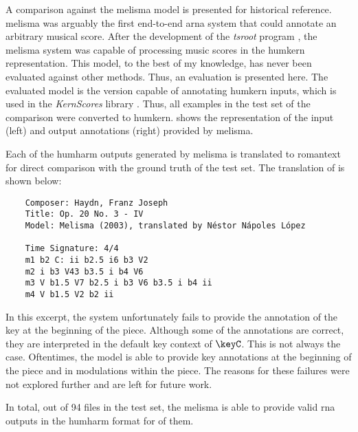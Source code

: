 
A comparison against the \gls{melisma} model is presented
for historical reference. \gls{melisma} was arguably the
first end-to-end \gls{arna} system that could annotate an
arbitrary musical score. After the development of the
\emph{tsroot} program \parencite{sapp2009tsroot}, the
\gls{melisma} system was capable of processing music scores
in the \gls{humkern} representation. This model, to the best
of my knowledge, has never been evaluated against other
methods. Thus, an evaluation is presented here. The
evaluated model is the version capable of annotating
\gls{humkern} inputs, which is used in the \emph{KernScores}
library \parencite{sapp2005online}. Thus, all examples in
the test set of the comparison were converted to
\gls{humkern}.  shows the
representation of the input (left) and output annotations
(right) provided by \gls{melisma}.


Each of the \gls{humharm} outputs generated by \gls{melisma}
is translated to \gls{romantext} for direct comparison with
the ground truth of the test set. The translation of
 is shown below:

\begin{verbatim}
    Composer: Haydn, Franz Joseph
    Title: Op. 20 No. 3 - IV
    Model: Melisma (2003), translated by Néstor Nápoles López
    
    Time Signature: 4/4
    m1 b2 C: ii b2.5 i6 b3 V2
    m2 i b3 V43 b3.5 i b4 V6
    m3 V b1.5 V7 b2.5 i b3 V6 b3.5 i b4 ii
    m4 V b1.5 V2 b2 ii
\end{verbatim}

In this excerpt, the system unfortunately fails to provide
the annotation of the key at the beginning of the piece.
Although some of the annotations are correct, they are
interpreted in the default key context of $\keyC$. This is
not always the case. Oftentimes, the model is able to
provide key annotations at the beginning of the piece and in
modulations within the piece. The reasons for these failures
were not explored further and are left for future work.

In total, out of 94 files in the test set, the \gls{melisma}
is able to provide valid \gls{rna} outputs in the
\gls{humharm} format for  of them.
